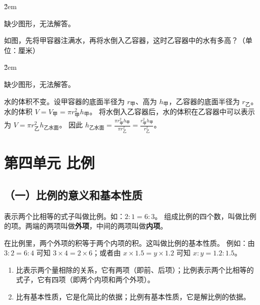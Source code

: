\v{2em}

\begin{warning}
    缺少图形，无法解答。
\end{warning}

\begin{example}
    如图，先将甲容器注满水，再将水倒入乙容器，这时乙容器中的水有多高？（单位：厘米）
\end{example}

\v{2em}

\begin{warning}
    缺少图形，无法解答。
\end{warning}
\begin{tips}[解题思路]
    水的体积不变。设甲容器的底面半径为 $r_甲$、高为 $h_甲$，乙容器的底面半径为 $r_乙$。
    水的体积 $V = V_{甲} = \pi r_甲^2 h_甲$。
    将水倒入乙容器后，水的体积在乙容器中可以表示为 $V = \pi r_乙^2 h_{乙水面}$。
    因此 $h_{乙水面} = \frac{\pi r_甲^2 h_甲}{\pi r_乙^2} = \frac{r_甲^2 h_甲}{r_乙^2}$。
\end{tips}

\section*{第四单元 比例}

\subsection*{（一）比例的意义和基本性质}

\begin{definition}[比例的意义]
    表示两个比相等的式子叫做比例。如：$2:1 = 6:3$。
    组成比例的四个数，叫做比例的项。两端的两项叫做\textbf{外项}，中间的两项叫做\textbf{内项}。
\end{definition}

\begin{theorem}[比例的基本性质]
    在比例里，两个外项的积等于两个内项的积。这叫做比例的基本性质。
    例如：由 $3:2 = 6:4$ 可知 $3 \times 4 = 2 \times 6$；或者由 $x \times 1.5 = y \times 1.2$ 可知 $x:y = 1.2:1.5$。
\end{theorem}

\begin{tips}[比和比例的区别]
    \begin{enumerate}
        \item 比表示两个量相除的关系，它有两项（即前、后项）；比例表示两个比相等的式子，它有四项（即两个内项和两个外项）。
        \item 比有基本性质，它是化简比的依据；比例有基本性质，它是解比例的依据。
    \end{enumerate}
\end{tips}


